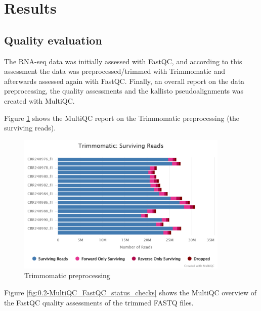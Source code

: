 \section{Results}

\subsection{Quality evaluation}

The RNA-seq data was initially assessed with FastQC, and according to this assessment the data was preprocessed/trimmed with Trimmomatic and afterwards assessed again with FastQC. Finally, an overall report on the data preprocessing, the quality assessments and the kallisto pseudoalignments was created with MultiQC.

Figure \ref{fig:0.1-MultiQC_FastQC_status_checks} shows the MultiQC report on the Trimmomatic preprocessing (the surviving reads).

\begin{figure}[htbp]
    \caption{Trimmomatic preprocessing}
    \label{fig:0.1-MultiQC_FastQC_status_checks}
    \includegraphics[width=0.9\textwidth]{../../results/multiqc/Plot-Exports/trimmomatic-surviving_reads}
\end{figure}

Figure \ref{fig:0.2-MultiQC_FastQC_status_checks} shows the MultiQC overview of the FastQC quality assessments of the trimmed FASTQ files.

